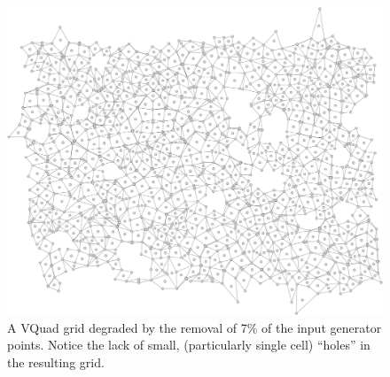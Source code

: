 \documentclass[a4paper,11pt]{report}
\begin{document}
\begin{figure}
\centering
\includegraphics[width=1.0\textwidth]{gen_pt_degen_7}
\caption[Generator Point Degradation]{
  A VQuad grid degraded by the removal of 7\% of the input generator points. Notice the lack of small, (particularly single cell) ``holes'' in the resulting grid.
}
\label{fig:genpt_degen}
\end{figure}
\end{document}
